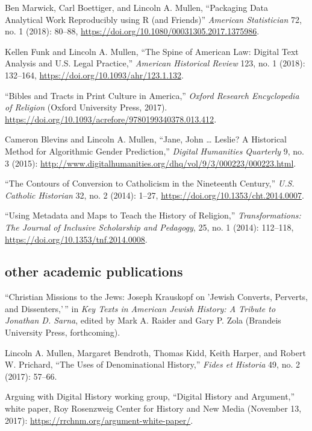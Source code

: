 \documentclass[11pt]{article}
\begin{document}
Ben Marwick, Carl Boettiger, and Lincoln A. Mullen, ``Packaging Data Analytical Work Reproducibly using R (and Friends)'' \emph{American Statistician} 72, no. 1 (2018): 80--88, \url{https://doi.org/10.1080/00031305.2017.1375986}.

Kellen Funk and Lincoln A. Mullen, ``The Spine of American Law: Digital Text Analysis and U.S. Legal Practice,'' \emph{American Historical Review} 123, no.  1 (2018): 132--164, \url{https://doi.org/10.1093/ahr/123.1.132}.

``Bibles and Tracts in Print Culture in America,'' \emph{Oxford Research Encyclopedia of Religion} (Oxford University Press, 2017). \url{ https://doi.org/10.1093/acrefore/9780199340378.013.412}.

Cameron Blevins and Lincoln A. Mullen, ``Jane, John \ldots{} Leslie? A Historical Method for Algorithmic Gender Prediction,'' \emph{Digital Humanities Quarterly} 9, no. 3 (2015): \url{http://www.digitalhumanities.org/dhq/vol/9/3/000223/000223.html}. 

``The Contours of Conversion to Catholicism in the Nineteenth Century,'' \emph{U.S. Catholic Historian} 32, no. 2 (2014): 1--27, \url{https://doi.org/10.1353/cht.2014.0007}. 

``Using Metadata and Maps to Teach the History of Religion,'' \emph{Transformations: The Journal of Inclusive Scholarship and Pedagogy}, 25, no. 1 (2014): 112--118, \url{https://doi.org/10.1353/tnf.2014.0008}.


\subsection{other academic publications}\label{other-academic}

``Christian Missions to the Jews: Joseph Krauskopf on 'Jewish Converts, Perverts, and Dissenters,'\,'' in \emph{Key Texts in American Jewish History: A Tribute to Jonathan D. Sarna}, edited by Mark A. Raider and Gary P. Zola (Brandeis University Press, forthcoming).

Lincoln A. Mullen, Margaret Bendroth, Thomas Kidd, Keith Harper, and Robert W. 
Prichard, ``The Uses of Denominational History,'' \emph{Fides et Historia} 49, 
no. 2 (2017): 57--66.

Arguing with Digital History working group, ``Digital History and Argument,'' 
white paper, Roy Rosenzweig Center for History and New Media (November 13, 
2017): \url{https://rrchnm.org/argument-white-paper/}.
\end{document}
